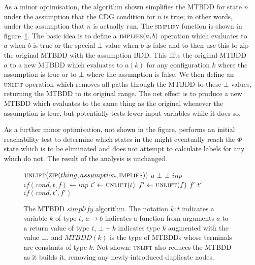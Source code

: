 
As a minor optimisation, the algorithm shown simplifies the MTBDD for
state $n$ under the assumption that the CDG condition for $n$ is true;
in other words, under the assumption that $n$ is actually run.  The
\textsc{simplify} function is shown in
figure~\ref{fig:derive:phi_elimination:simplify}.  The basic idea is
to define a $\textsc{implies}(a, b)$ operation which evaluates to $a$
when $b$ is true or the special $\bot$ value when $b$ is false and to
then use this to zip the original MTBDD with the assumption BDD.  This
lifts the original MTBDD $a$ to a new MTBDD which evaluates to $a(k)$
for any configuration $k$ where the assumption is true or to $\bot$
where the assumption is false.  We then define an \textsc{unlift}
operation which removes all paths through the MTBDD to these $\bot$
values, returning the MTBDD to its original range.  The net effect is
to produce a new MTBDD which evaluates to the same thing as the
original whenever the assumption is true, but potentially tests fewer
input variables while it does so.

As a further minor optimisation, not shown in the figure,
{\implementation} performs an initial reachability test to determine
which states in the {\StateMachine} might eventually reach the $\Phi$
state which is to be eliminated and does not attempt to calculate
labels for any which do not.  The result of the analysis is unchanged.

\begin{figure}
\begin{algorithmic}
  \State \Return $\textsc{unlift}(\textsc{zip}(thing, assumption, \textsc{implies}))$
\EndFunction
{}
    \State \Return $a$
  \Else
    \State \Return $\bot$
  \EndIf
\EndFunction
{}
    \State \Return $\bot$
    \State \Return $inp$
  \Else
    \State $if(cond, t, f) \gets inp$
    \State $t' \gets \textsc{unlift}(t)$
    \State $f' \gets \textsc{unlift}(f)$
      \State \Return $f'$
      \State \Return $t'$
    \Else
      \State \Return $if(cond, t', f')$
    \EndIf
  \EndIf
\EndFunction
\end{algorithmic}
\caption{The MTBDD $simplify$ algorithm.  The notation $k:t$ indicates
  a variable $k$ of type $t$, $a \rightarrow b$ indicates a function
  from arguments $a$ to a return value of type $t$, $\bot + k$
  indicates type $k$ augmented with the value $\bot$, and $MTBDD(k)$
  is the type of MTBDDs whose terminals are constants of type $k$.
  Not shown: \textsc{unlift} also reduces the MTBDD as it builds it,
  removing any newly-introduced duplicate nodes.}
\label{fig:derive:phi_elimination:simplify}
\end{figure}

